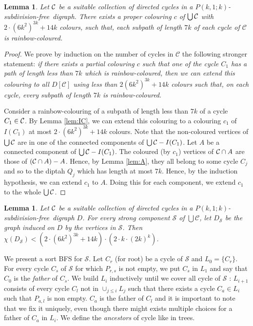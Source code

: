 \documentclass[utf8,10pt]{article}
\theoremstyle{plain}
\newtheorem{lemma}[theorem]{Lemma}
\theoremstyle{definition}
\theoremstyle{remark}
\newcommand{\dr}{ k \cdot (2k)^k}
\newcommand{\col}{(6k^2)^{3k}}
\newcommand{\free}{subdivision-free}
\begin{document}
\begin{lemma}\label{lem:col-union-cycle}
Let ${\cal C}$ be a suitable collection of directed cycles in a $P(k,1;k)$-\free\ digraph.
There exists a proper colouring $c$ of $\bigcup{\cal C}$ with $2\cdot \col + 14k$ colours, such that, each subpath of length $7k$ of each cycle of $\mathcal{C}$ is rainbow-coloured.
\end{lemma}
\begin{proof}
We prove by induction on the number of cycles in $\mathcal{C}$ the following stronger statement:
{\it if there exists
a partial colouring $c$ such that one of the cycle $C_1$ has a path of length less than $7k$
which is rainbow-coloured, then we can extend this colouring to all $D[\mathcal{C}]$ using less
than $2\col +14k$ colours such that, on each cycle, every subpath of length
$7k$ is rainbow-coloured}.

Consider a rainbow-colouring of a subpath of length less than $7k$ of a cycle $C_1\in {\cal C}$.
By Lemma \ref{lem:IC}, we can extend this colouring to a colouring $c_1$ of $I(C_1)$ at most $2\cdot \col + 14k$ colours.
Note that the non-coloured vertices of $\bigcup{\cal C}$ are in one of the connected components of $\bigcup{\cal C} - I(C_1)$.
Let $A$ be a connected component of $\bigcup{\cal C} - I(C_1)$. The coloured (by $c_1$) vertices of ${\cal C}\cap A$ are those of $({\cal C}\cap A)-A$. Hence, by Lemma \ref{lem:A}, they all belong to some cycle $C_j$ and so to the diptah $Q_j$ which has length at most $7k$.
Hence, by the induction hypothesis, we can extend $c_1$ to $A$. Doing this for each component, we extend $c_1$ to the whole $\bigcup{\cal C}$.
\end{proof}





\begin{lemma}\label{lem:DC}
Let ${\cal C}$ be a suitable collection of directed cycles in a $P(k,1;k)$-\free\ digraph $D$.
For every strong component $\mathcal{S}$ of $\bigcup \mathcal{C}$, let $D_{\mathcal{S}}$ be the graph induced 
on $D$ by the vertices in $\mathcal{S}$. Then $\chi(D_{\mathcal{S}}) < (2\cdot \col + 14k) \cdot (2 \cdot \dr)$.
\end{lemma}


We present a sort BFS for $\mathcal{S}$.
Let $C_r$ (for root) be a cycle of $\mathcal{S}$ and $L_0 = \{C_r\}$. For every cycle $C_s$ of $\mathcal{S}$ for which 
$P_{r,s}$ is not empty, we put $C_s$ in $L_1$ and say that $C_0$ is the \textit{father} of $C_s$. We build $L_i$ inductively
until we cover all cycle of $\mathcal{S}$ : $L_{i+1}$ consists of every cycle $C_l$ not in $\cup_{j \leq i} L_j$ such that 
there exists a cycle $C_a \in L_i$ such that $P_{a,l}$ is non empty. $C_a$ is the father of $C_l$ and it is important to note that we 
fix it uniquely, even though there might exists multiple choices for a father of $C_a$ in $L_i$. We define the \textit{ancestors} of 
cycle like in trees.
\end{document}
